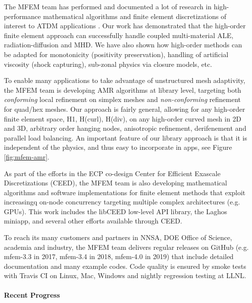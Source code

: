 The MFEM team has performed and documented a lot of research in
high-performance mathematical algorithms and finite element discretizations
of interest to ATDM applications
\cite{BLAST18,BLASTFCT18,BLASTFCT17,BLAST16,BLAST14,BLAST13,BLAST12,BLAST11}.
Our work has demonstrated that the high-order finite element approach can
successfully handle coupled multi-material ALE, radiation-diffusion and MHD.
We have also shown how high-order methods can be adapted for monotonicity
(positivity preservation), handling of artificial viscosity (shock capturing),
sub-zonal physics via closure models, etc.

To enable many applications to take advantage of unstructured mesh adaptivity,
the MFEM team is developing AMR algorithms at library level, targeting both
{\em conforming} local refinement on simplex meshes and {\em non-conforming}
refinement for quad/hex meshes. Our approach is fairly general, allowing for
any high-order finite element space, H1, H(curl), H(div), on any high-order
curved mesh in 2D and 3D, arbitrary order hanging nodes, anisotropic refinement,
derifenement and parallel load balancing.
An important feature of our library approach is that it is independent of
the physics, and thus easy to incorporate in apps, see Figure \ref{fig:mfem-amr}.

As part of the efforts in the ECP co-design Center for Efficient Exascale
Discretizations (CEED), the MFEM team is also developing mathematical algorithms
and software implementations for finite element methods that exploit increasingq
on-node concurrency targeting multiple complex architectures (e.g. GPUs). This
work includes the libCEED low-level API library, the Laghos miniapp, and several
other efforts available through CEED.

To reach its many customers and partners in NNSA, DOE Office of Science,
academia and industry, the MFEM team delivers regular releases on GitHub
(e.g. mfem-3.3 in 2017, mfem-3.4 in 2018, mfem-4.0 in 2019) that include
detailed documentation and many example codes.  Code quality is ensured
by smoke tests with Travis CI on Linux, Mac, Windows and nightly
regression testing at LLNL.

\paragraph{Recent Progress}

